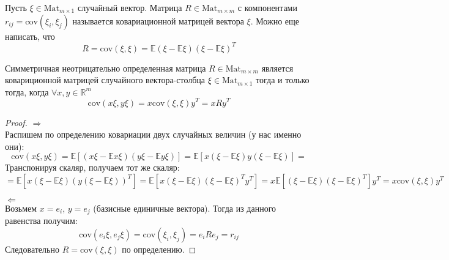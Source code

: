 \begin{definition}
Пусть $\xi \in \text{Mat}_{m \times 1}$ случайный вектор. Матрица $R \in \text{Mat}_{m \times m}$ с компонентами $r_{ij} = \text{cov} \left(\xi_i, \xi_j\right)$
называется $\textit{ковариационной матрицей}$ вектора $\xi$. Можно еще написать, что 
\[
    R = \text{cov} \left(\xi, \xi\right) = \mathbb{E} \left(\xi - \mathbb{E} \xi\right) \left(\xi - \mathbb{E} \xi\right)^T
\]
\end{definition}
\begin{lemma}
Симметричная неотрицательно определенная матрица $R \in \text{Mat}_{m \times m}$ является ковариционной матрицей случайного вектора-столбца $\xi \in \text{Mat}_{m \times 1}$ тогда и только тогда, когда $\forall x, y \in \mathbb{R} ^ m$
\[
    \text{cov} \left(x\xi, y \xi\right) = x \text{cov} \left(\xi, \xi\right) y ^ T = x R y ^ T
\]
\end{lemma}

\begin{proof}
$\Rightarrow$ \\
Распишем по определению ковариации двух случайных величин (у нас именно они):
\[
    \text{cov} \left(x\xi, y \xi\right) = \mathbb{E} \left[\left(x \xi - \mathbb{E} x \xi\right) \left(y \xi - \mathbb{E} y \xi \right)\right] = \mathbb{E} \left[x \left(\xi - \mathbb{E} \xi\right) y \left(\xi - \mathbb{E} \xi\right)\right]
     = 
\]
Транспонируя скаляр, получаем тот же скаляр:
\[
    = \mathbb{E} \left[x \left(\xi - \mathbb{E} \xi\right) \left(y \left(\xi - \mathbb{E} \xi\right)\right) ^ T\right] 
    = \mathbb{E} \left[x \left(\xi - \mathbb{E} \xi\right)\left(\xi - \mathbb{E} \xi\right) ^ T y ^ T\right] 
    = x \mathbb{E} \left[\left(\xi - \mathbb{E} \xi\right)\left(\xi - \mathbb{E} \xi\right) ^ T\right] y ^ T
    = x \text{cov} \left(\xi, \xi\right) y ^ T
\]

$\Leftarrow$ \\
Возьмем $x = e_i$, $y = e_j$ (базисные единичные вектора). Тогда из данного равенства получим:
\[
    \text{cov} \left(e_i \xi, e_j \xi\right) = \text{cov} \left(\xi_i, \xi_j\right) = e_i R e_j = r_{ij}
\]
Следовательно $R = \text{cov} \left(\xi, \xi\right)$ по определению.

\end{proof}

